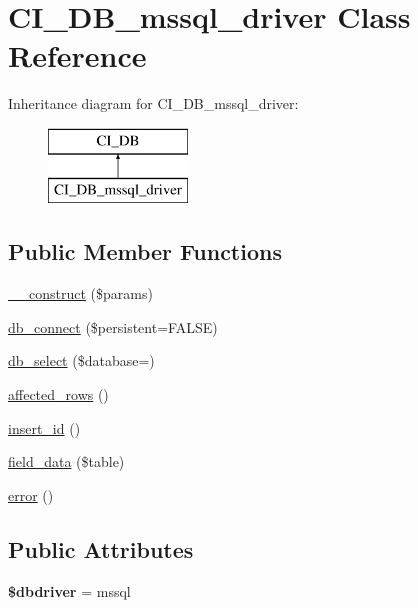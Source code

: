 \hypertarget{class_c_i___d_b__mssql__driver}{}\section{C\+I\+\_\+\+D\+B\+\_\+mssql\+\_\+driver Class Reference}
\label{class_c_i___d_b__mssql__driver}
Inheritance diagram for C\+I\+\_\+\+D\+B\+\_\+mssql\+\_\+driver\+:\begin{figure}[H]
\begin{center}
\leavevmode
\includegraphics[height=2.000000cm]{class_c_i___d_b__mssql__driver}
\end{center}
\end{figure}
\subsection*{Public Member Functions}
\begin{DoxyCompactItemize}
\item 
\mbox{\hyperlink{class_c_i___d_b__mssql__driver_a68e1cf7f7648858a9a59f05082ca402f}{\+\_\+\+\_\+construct}} (\$params)
\item 
\mbox{\hyperlink{class_c_i___d_b__mssql__driver_ad1e7ee6494f1638a6fef75b0912eb302}{db\+\_\+connect}} (\$persistent=F\+A\+L\+SE)
\item 
\mbox{\hyperlink{class_c_i___d_b__mssql__driver_a41c36ed8641dbb61f419328c63578a4d}{db\+\_\+select}} (\$database=\textquotesingle{}\textquotesingle{})
\item 
\mbox{\hyperlink{class_c_i___d_b__mssql__driver_a4eca3dff142742397c338dcf245555bc}{affected\+\_\+rows}} ()
\item 
\mbox{\hyperlink{class_c_i___d_b__mssql__driver_a720c715b760f74b63bb40184250daba1}{insert\+\_\+id}} ()
\item 
\mbox{\hyperlink{class_c_i___d_b__mssql__driver_ac13ce87ffc4570a1154e339fd68bea9c}{field\+\_\+data}} (\$table)
\item 
\mbox{\hyperlink{class_c_i___d_b__mssql__driver_ae24ae4efe05103a9db96af64e2ed7877}{error}} ()
\end{DoxyCompactItemize}
\subsection*{Public Attributes}
\begin{DoxyCompactItemize}
\item 
\mbox{\label{class_c_i___d_b__mssql__driver_a6ca9af028894a9ca95fa3e4d2f7ce6ba}} 
{\bfseries \$dbdriver} = \textquotesingle{}mssql\textquotesingle{}
\end{DoxyCompactItemize}
